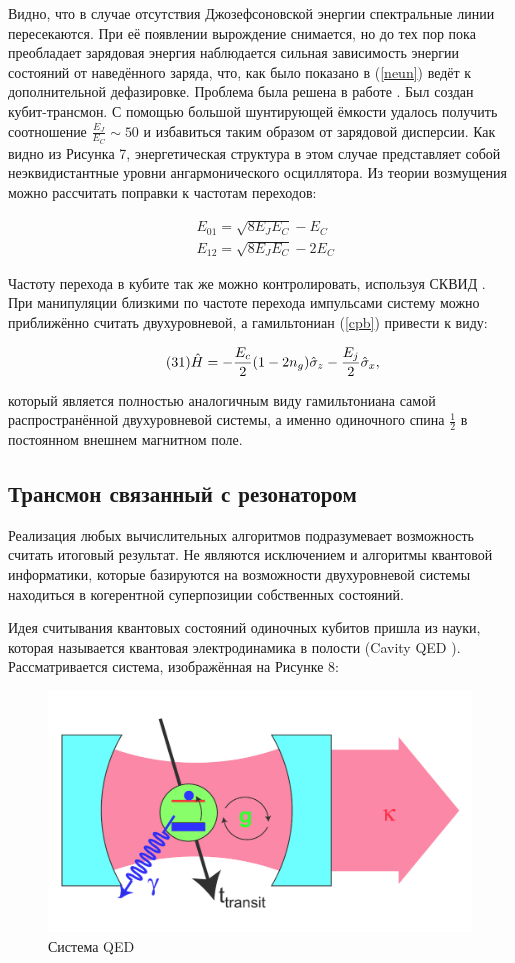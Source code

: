 Видно, что в случае отсутствия Джозефсоновской энергии спектральные линии пересекаются. При её появлении вырождение снимается, но до тех пор пока преобладает зарядовая энергия наблюдается сильная зависимость энергии состояний от наведённого заряда, что, как было показано в (\ref{neun}) ведёт к дополнительной дефазировке.  Проблема была решена в работе \cite{Koch2007}. Был создан кубит-трансмон. С помощью большой шунтирующей ёмкости удалось  получить соотношение $\frac{E_J}{E_C}  \sim 50$ и избавиться таким образом от зарядовой дисперсии. Как видно из Рисунка 7, энергетическая структура в этом случае представляет собой неэквидистантные уровни ангармонического осциллятора. Из теории возмущения можно рассчитать поправки к частотам переходов:

\begin{equation}
\tag{30}
\begin{split}
&E_{01}= \sqrt{8E_JE_C}- E_C\\
&E_{12}= \sqrt{8E_JE_C}-2E_C
\end{split}
\end{equation}  

Частоту перехода в кубите так же можно контролировать, используя СКВИД \cite{Kleiner2004}. При манипуляции близкими по частоте перехода импульсами систему можно приближённо считать двухуровневой, а гамильтониан (\ref{cpb}) привести к виду:

\begin{equation}
\label{spinham}
\tag{31}
\hat H = -\frac{E_c}{2}(1-2 n_g)\hat \sigma_z - \frac{E_j}{2}\hat\sigma_x, 
\\
\end{equation}

\noindent который является полностью аналогичным виду гамильтониана самой распространённой двухуровневой системы, а именно одиночного спина $\frac{1}{2}$ в постоянном внешнем магнитном поле. 

\subsection{Трансмон связанный с резонатором} \label{transres}
Реализация любых вычислительных алгоритмов подразумевает возможность считать итоговый результат\cite{Wallraff2005}. Не являются исключением и алгоритмы квантовой информатики, которые базируются на возможности двухуровневой системы находиться в когерентной суперпозиции собственных состояний. 

Идея считывания квантовых состояний одиночных кубитов пришла из науки, которая называется квантовая электродинамика в полости (Cavity QED \cite{Blais2004}). Рассматривается система, изображённая на Рисунке 8:
\begin{figure}[h]
	\centering
	\includegraphics[width=0.5\linewidth]{pictures/qed}
	\caption{Система QED}
	\label{fig:qed}
\end{figure}

